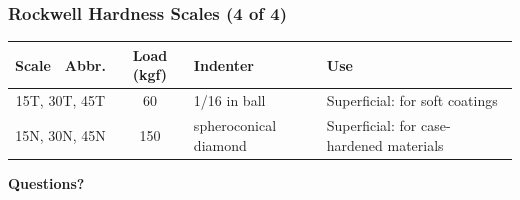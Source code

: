 \begin{frame}
	\frametitle{Rockwell Hardness Scales (4 of 4)}

    \begin{table}
        \centering
        \footnotesize
        \setlength{\tabcolsep}{4pt}
        \begin{tabularx}{\linewidth}{
            c
            c
            c
            >{\hsize=0.65\hsize\raggedright\arraybackslash}X
            >{\hsize=1.35\hsize\raggedright\arraybackslash}X
        }
            \toprule
                Scale & Abbr. & Load (kgf) & Indenter & Use \\
            \midrule
                \multicolumn{2}{c}{15T, 30T, 45T} &   60  &   1/16 in ball   &   Superficial: for soft coatings\\
                \multicolumn{2}{c}{15N, 30N, 45N}   &   150  &   spheroconical diamond   &   Superficial: for case-hardened materials\\
            \bottomrule
        \end{tabularx}
    \end{table}
\end{frame}

\begin{frame}
    \centering
    {\Huge \textbf{\textcolor{BakerADARed}{Questions?}}}
\end{frame}

